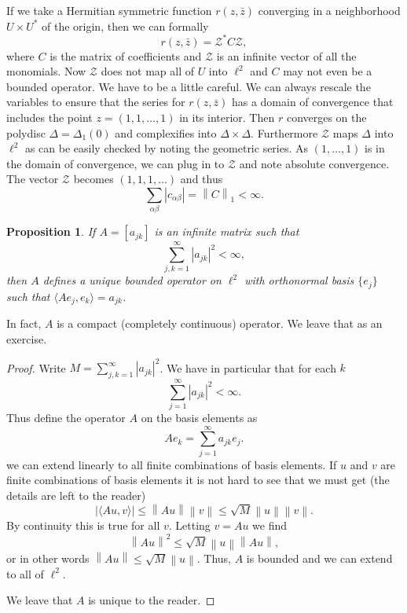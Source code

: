 \documentclass[12pt,openany]{book}
\newcommand{\abs}[1]{\left\lvert {#1} \right\rvert}
\newcommand{\norm}[1]{\left\lVert {#1} \right\rVert}
\newcommand{\sZ}{{\mathcal{Z}}}
\theoremstyle{plain}
\newtheorem{prop}[thm]{Proposition}
\theoremstyle{remark}
\theoremstyle{definition}
\theoremstyle{exercise}
\theoremstyle{example}
\begin{document}
If we take a Hermitian symmetric function $r(z,\bar{z})$ converging
in a neighborhood $U \times U^*$ of the origin, then we can formally
\begin{equation}
r(z,\bar{z}) = \sZ^* C \sZ ,
\end{equation}
where $C$ is the matrix of coefficients and $\sZ$ is an infinite vector
of all the monomials.  Now $\sZ$ does not map all of $U$ into $\ell^2$
and $C$ may not even be a bounded operator.  We have to be a little careful.
We can always rescale the variables to ensure that the series for
$r(z,\bar{z})$ has a domain of convergence that includes the point
$z=(1,1,\ldots,1)$ in its interior.
Then $r$ converges on the polydisc $\Delta =
\Delta_1(0)$ and complexifies into $\Delta \times \Delta$.  Furthermore
$\sZ$ maps $\Delta$ into $\ell^2$ as can be easily checked by noting the
geometric series.  As
$(1,\ldots,1)$ is in the domain of convergence, we can plug in to $\sZ$
and note absolute convergence.  The vector $\sZ$ becomes $(1,1,1,\ldots)$
and thus
\begin{equation}
\sum_{\alpha \beta} \abs{c_{\alpha \beta}} = \norm{C}_1 < \infty .
\end{equation}

\begin{prop} \label{prop:matbndop}
If $A = [a_{jk}]$ is an infinite matrix such that
\begin{equation}
\sum_{j,k = 1}^\infty \abs{a_{jk}}^2 < \infty ,
\end{equation}
then $A$ defines a unique bounded operator on $\ell^2$
with orthonormal basis $\{ e_j \}$ such that
$\langle A e_j , e_k \rangle = a_{jk}$.
\end{prop}

In fact, $A$ is a compact (completely continuous) operator.  We leave that as
an exercise.

\begin{proof}
Write $M= \sum_{j,k = 1}^\infty \abs{a_{jk}}^2$.
We have in particular that for each $k$
\begin{equation}
\sum_{j = 1}^\infty \abs{a_{jk}}^2 < \infty .
\end{equation}
Thus define the operator $A$ on the basis elements as
\begin{equation}
A e_k = \sum_{j=1}^\infty a_{jk} e_j .
\end{equation}
we can extend linearly to all finite combinations of basis elements.
If $u$ and $v$ are finite combinations of basis elements it is not hard
to see that we must get
(the details are left to the reader)
\begin{equation}
\abs{\langle A u , v \rangle} \leq
\norm{Au}\norm{v}
\leq
\sqrt{M} \norm{u} \norm{v} .
\end{equation}
By continuity this is true for all $v$.  Letting $v=Au$ we find
\begin{equation}
\norm{Au}^2 \leq \sqrt{M} \norm{u} \norm{Au},
\end{equation}
or in other words $\norm{Au} \leq \sqrt{M} \norm{u}$.  Thus, $A$ is bounded
and we can extend to all of $\ell^2$.

We leave that $A$ is unique to the reader.
\end{proof}
\end{document}
